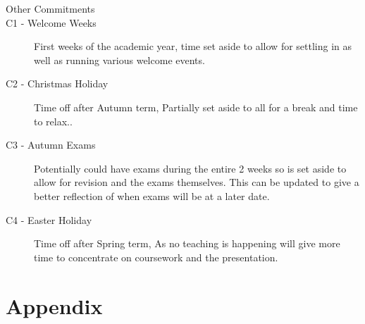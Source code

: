 \documentclass[a4paper]{article}
\begin{document}
\begin{description}
\item [\large{Other Commitments}]
\item [C1 - Welcome Weeks]
First weeks of the academic year, time set aside to allow for settling in as well as running various welcome events.
\item [C2 - Christmas Holiday]
Time off after Autumn term, Partially set aside to all for a break and time to relax..
\item [C3 - Autumn Exams]
Potentially could have exams during the entire 2 weeks so is set aside to allow for revision and the exams themselves.
This can be updated to give a better reflection of when exams will be at a later date.
\item [C4 - Easter Holiday]
Time off after Spring term, As no teaching is happening will give more time to concentrate on coursework and the presentation.
\end{description}

\section{Appendix}
\nocite{*}


\end{document}
